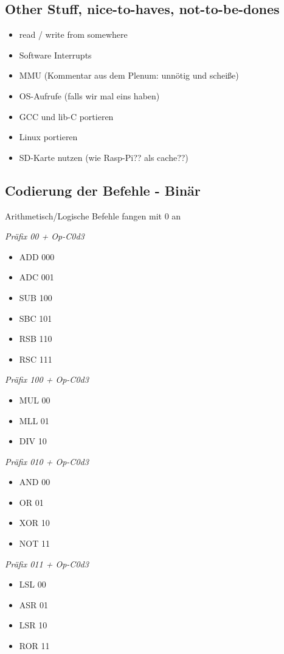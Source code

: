 \documentclass[a4paper]{article}
\begin{document}
\subsection{Other Stuff, nice-to-haves, not-to-be-dones}

\begin{itemize}
\item read / write from somewhere
\item Software Interrupts
\item MMU (Kommentar aus dem Plenum: unnötig und scheiße)
\item OS-Aufrufe (falls wir mal eins haben)
\item GCC und lib-C portieren
\item Linux portieren
\item SD-Karte nutzen (wie Rasp-Pi?? als cache??)
\end{itemize}

\subsection{Codierung der Befehle - Binär}
Arithmetisch/Logische Befehle fangen mit 0 an
\begin{multicols}{2}
\emph{Präfix 00 + {Op-C0d3}}
\begin{itemize}
\item ADD 000
\item ADC 001
\item SUB 100
\item SBC 101
\item RSB 110
\item RSC 111
\end{itemize}

\emph{Präfix 100 + {Op-C0d3}}
\begin{itemize}
\item MUL 00
\item MLL 01
\item DIV 10
\end{itemize}

\emph{Präfix 010 + {Op-C0d3}}
\begin{itemize}
\item AND 00
\item OR 01
\item XOR 10
\item NOT 11
\end{itemize}


\emph{Präfix 011 + {Op-C0d3}}
\begin{itemize}
\item LSL 00
\item ASR 01
\item LSR 10
\item ROR 11
\end{itemize}


\end{multicols}
\end{document}
